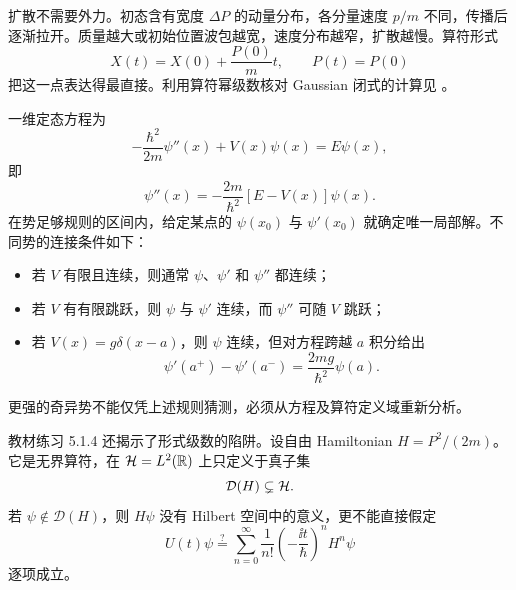 扩散不需要外力。初态含有宽度 $\Delta P$ 的动量分布，各分量速度 $p/m$ 不同，传播后逐渐拉开。质量越大或初始位置波包越宽，速度分布越窄，扩散越慢。算符形式
\begin{equation}
  X(t)=X(0)+\frac{P(0)}{m}t,
  \qquad P(t)=P(0)
  \label{eq:QM-C05-S01-heisenberg-free-motion}
\end{equation}
把这一点表达得最直接。利用算符幂级数核对 Gaussian 闭式的计算见
。



一维定态方程为
\begin{equation}
  -\frac{\hbar^2}{2m}\psi''(x)+V(x)\psi(x)=E\psi(x),
  \label{eq:QM-C05-S01-stationary-equation}
\end{equation}
即
\begin{equation}
  \psi''(x)=-\frac{2m}{\hbar^2}[E-V(x)]\psi(x).
  \label{eq:QM-C05-S01-second-derivative-equation}
\end{equation}
在势足够规则的区间内，给定某点的 $\psi(x_0)$ 与 $\psi'(x_0)$ 就确定唯一局部解。不同势的连接条件如下：
\begin{itemize}[leftmargin=*]
  \item 若 $V$ 有限且连续，则通常 $\psi$、$\psi'$ 和 $\psi''$ 都连续；
  \item 若 $V$ 有有限跳跃，则 $\psi$ 与 $\psi'$ 连续，而 $\psi''$ 可随 $V$ 跳跃；
  \item 若 $V(x)=g\delta(x-a)$，则 $\psi$ 连续，但对方程跨越 $a$ 积分给出
  \begin{equation}
    \boxed{
    \psi'(a^+)-\psi'(a^-)
    =\frac{2mg}{\hbar^2}\psi(a)}.
    \label{eq:QM-C05-S01-delta-derivative-jump}
  \end{equation}
\end{itemize}
更强的奇异势不能仅凭上述规则猜测，必须从方程及算符定义域重新分析。

教材练习 5.1.4 还揭示了形式级数的陷阱。设自由 Hamiltonian $H=P^2/(2m)$。它是无界算符，在 $\mathcal{H}=L^2(\mathbb{R})$ 上只定义于真子集
\begin{equation}
  \mathcal D(H)\subsetneq\mathcal{H}.
  \label{eq:QM-C05-S01-h-domain}
\end{equation}
若 $\psi\notin\mathcal D(H)$，则 $H\psi$ 没有 Hilbert 空间中的意义，更不能直接假定
\begin{equation}
  U(t)\psi
  \stackrel{?}{=}
  \sum_{n=0}^{\infty}
  \frac{1}{n!}\left(-\frac{\ii t}{\hbar}\right)^nH^n\psi
  \label{eq:QM-C05-S01-invalid-power-series}
\end{equation}
逐项成立。

